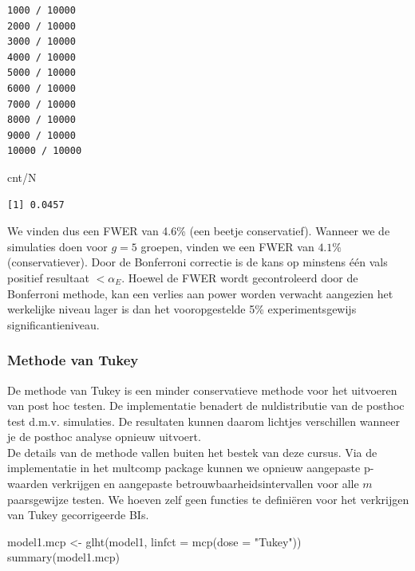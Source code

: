 \documentclass[
  dutch,
  letterpaper,
  12pt]{book}
\newenvironment{Shaded}{\begin{snugshade}}{\end{snugshade}}
\newcommand{\AttributeTok}[1]{\textcolor[rgb]{0.40,0.45,0.13}{#1}}
\newcommand{\FunctionTok}[1]{\textcolor[rgb]{0.28,0.35,0.67}{#1}}
\newcommand{\NormalTok}[1]{\textcolor[rgb]{0.00,0.23,0.31}{#1}}
\newcommand{\OtherTok}[1]{\textcolor[rgb]{0.00,0.23,0.31}{#1}}
\newcommand{\SpecialCharTok}[1]{\textcolor[rgb]{0.37,0.37,0.37}{#1}}
\newcommand{\StringTok}[1]{\textcolor[rgb]{0.13,0.47,0.30}{#1}}
\theoremstyle{definition}
\theoremstyle{definition}
\theoremstyle{definition}
\theoremstyle{remark}
\begin{document}
\begin{verbatim}
1000 / 10000 
2000 / 10000 
3000 / 10000 
4000 / 10000 
5000 / 10000 
6000 / 10000 
7000 / 10000 
8000 / 10000 
9000 / 10000 
10000 / 10000 
\end{verbatim}

\begin{Shaded}
\begin{Highlighting}[]
\NormalTok{cnt}\SpecialCharTok{/}\NormalTok{N}
\end{Highlighting}
\end{Shaded}

\begin{verbatim}
[1] 0.0457
\end{verbatim}

We vinden dus een FWER van 4.6\% (een beetje conservatief). Wanneer we
de simulaties doen voor \(g=5\) groepen, vinden we een FWER van
\(4.1\%\) (conservatiever). Door de Bonferroni correctie is de kans op
minstens één vals positief resultaat \(< \alpha_E\). Hoewel de FWER
wordt gecontroleerd door de Bonferroni methode, kan een verlies aan
power worden verwacht aangezien het werkelijke niveau lager is dan het
vooropgestelde 5\% experimentsgewijs significantieniveau.

\subsubsection{Methode van Tukey}\label{methode-van-tukey}

De methode van Tukey is een minder conservatieve methode voor het
uitvoeren van post hoc testen. De implementatie benadert de
nuldistributie van de posthoc test d.m.v. simulaties. De resultaten
kunnen daarom lichtjes verschillen wanneer je de posthoc analyse opnieuw
uitvoert.\\
De details van de methode vallen buiten het bestek van deze cursus. Via
de implementatie in het multcomp package kunnen we opnieuw aangepaste
p-waarden verkrijgen en aangepaste betrouwbaarheidsintervallen voor alle
\(m\) paarsgewijze testen. We hoeven zelf geen functies te definiëren
voor het verkrijgen van Tukey gecorrigeerde BIs.

\begin{Shaded}
\begin{Highlighting}[]
\NormalTok{model1.mcp }\OtherTok{\textless{}{-}} \FunctionTok{glht}\NormalTok{(model1, }\AttributeTok{linfct =} \FunctionTok{mcp}\NormalTok{(}\AttributeTok{dose =} \StringTok{"Tukey"}\NormalTok{))}
\FunctionTok{summary}\NormalTok{(model1.mcp)}
\end{Highlighting}
\end{Shaded}
\end{document}
